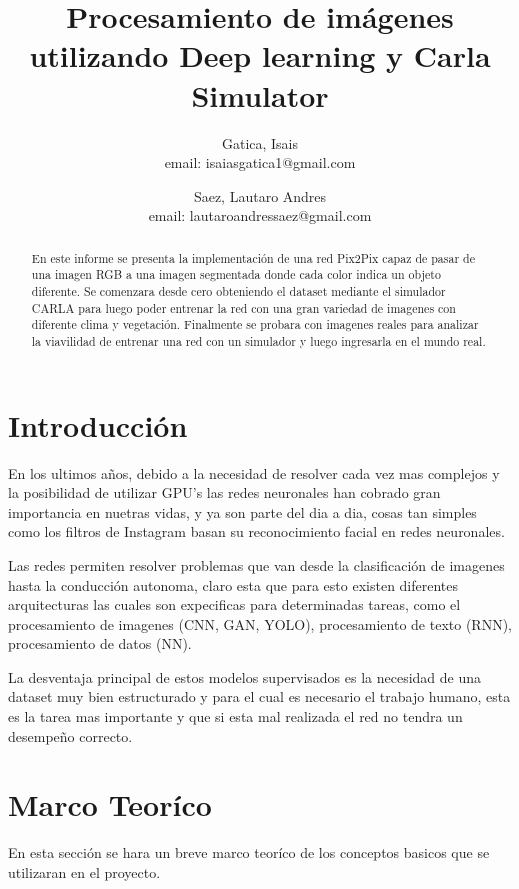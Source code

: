 \documentclass[]{IEEEtran}
\title{Procesamiento de imágenes utilizando Deep learning y Carla 
Simulator}
\author{ 
Gatica, Isais \\ \small{email: isaiasgatica1@gmail.com} \\ \and 
Saez, Lautaro Andres \\ \small{email: lautaroandressaez@gmail.com } }
\date{}
\begin{document}
    \maketitle

    \begin{abstract}
        En este informe se presenta la implementación de una red Pix2Pix capaz de pasar de una imagen RGB a 
        una imagen segmentada donde cada color indica un objeto diferente. Se comenzara desde cero obteniendo el 
        dataset mediante el simulador CARLA para luego poder entrenar la red con una gran variedad de imagenes con 
        diferente clima y vegetación. Finalmente se probara con imagenes reales para analizar la viavilidad de entrenar una 
        red con un simulador y luego ingresarla en el mundo real.
    \end{abstract}

    \section{Introducción}

    En los ultimos años, debido a la necesidad de resolver cada vez mas complejos y la posibilidad de utilizar GPU's las redes neuronales han cobrado 
    gran importancia en nuetras vidas, y ya son parte del dia a dia, cosas tan simples como los filtros de Instagram basan 
    su reconocimiento facial en redes neuronales. 

    Las redes permiten resolver problemas que van desde la clasificación de imagenes hasta la conducción autonoma, claro esta 
    que para esto existen diferentes arquitecturas las cuales son expecificas para determinadas tareas, como el procesamiento de imagenes (CNN, GAN, YOLO), 
    procesamiento de texto (RNN), procesamiento de datos (NN).

    La desventaja principal de estos modelos supervisados es la necesidad de una dataset muy bien estructurado y para el cual es necesario 
    el trabajo humano, esta es la tarea mas importante y que si esta mal realizada el red no tendra un desempeño correcto.



    \section{Marco Teoríco}

    En esta sección se hara un breve marco teoríco de los conceptos basicos que se utilizaran en 
    el proyecto.
\end{document}
